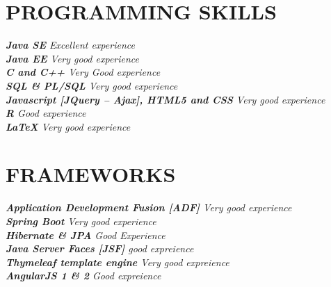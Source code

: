 \documentclass[10pt]{res} %
\begin{document}
\begin{resume}
\begin{itemize}
\newpage

\section{\large \color{blue} PROGRAMMING SKILLS}
 \vspace{5pt}
{\sl \textbf{ Java SE } \hfill  Excellent experience }\\
{\sl \textbf{ Java EE } \hfill Very good experience }\\
{\sl \textbf{ C and C++ } \hfill Very Good experience }\\
{\sl \textbf{ SQL \& PL/SQL } \hfill Very good experience }\\
{\sl \textbf{ Javascript [JQuery -- Ajax], HTML5 and CSS } \hfill Very good experience }\\
{\sl \textbf{ R } \hfill Good experience }\\
{\sl \textbf{ \LaTeX } \hfill Very good experience }\\

\vspace{0.2in} %
\section{\large \color{blue}FRAMEWORKS}
\vspace{5pt}
{\sl \textbf{ Application Development Fusion [ADF]}  \hfill Very good experience}\\
{\sl \textbf{ Spring Boot }   \hfill Very good experience}\\
{\sl \textbf{ Hibernate \& JPA }  \hfill  Good Experience }\\
{\sl \textbf{ Java Server Faces [JSF] } \hfill good expreience}\\
{\sl \textbf{ Thymeleaf template engine } \hfill Very good expreience}\\
{\sl \textbf{ AngularJS 1 \& 2 } \hfill Good expreience}\\

\vspace{0.2in}

\end{itemize}
\end{resume}
\end{document}
